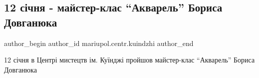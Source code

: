  
 
 
 
 

\subsection{12 січня - майстер-клас \enquote{Акварель} Бориса Довганюка}
\label{sec:16_01_2019.fb.mariupol.centr.kuindzhi.1.12_sichnja_majster_klass_akvarel_borys_dovganjuk}

\ifcmt
 author_begin
   author_id mariupol.centr.kuindzhi
 author_end
\fi

12 січня в Центрі мистецтв ім. Куїнджі пройшов майстер-клас \enquote{Акварель} Бориса
Довганюка 🎨

